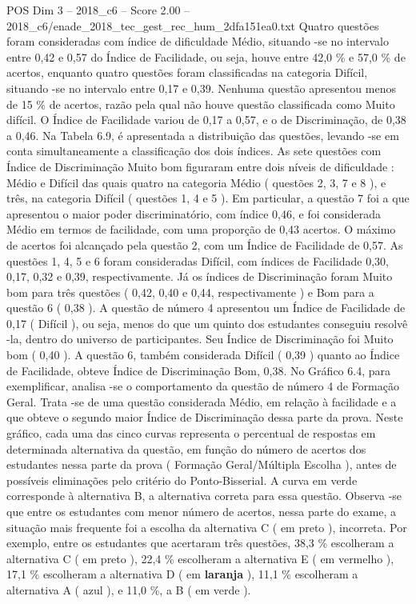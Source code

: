 \begin{textsample}{POS Dim 3 – 2018\_c6 – Score 2.00 – 2018\_c6/enade\_2018\_tec\_gest\_rec\_hum\_2dfa151ea0.txt}
Quatro questões foram consideradas com índice de dificuldade Médio, situando -se no intervalo entre 0,42 e 0,57 do Índice de Facilidade, ou seja, houve entre 42,0 \% e 57,0 \% de acertos, enquanto quatro questões foram classificadas na categoria Difícil, situando -se no intervalo entre 0,17 e 0,39.
Nenhuma questão apresentou menos de 15 \% de acertos, razão pela qual não houve questão classificada como Muito difícil.
O Índice de Facilidade variou de 0,17 a 0,57, e o de Discriminação, de 0,38 a 0,46.
Na Tabela 6.9, é apresentada a distribuição das questões, levando -se em conta simultaneamente a classificação dos dois índices.
As sete questões com Índice de Discriminação Muito bom figuraram entre dois níveis de dificuldade : Médio e Difícil das quais quatro na categoria Médio ( questões 2, 3, 7 e 8 ), e três, na categoria Difícil ( questões 1, 4 e 5 ).
Em particular, a questão 7 foi a que apresentou o maior poder discriminatório, com índice 0,46, e foi considerada Médio em termos de facilidade, com uma proporção de 0,43 acertos.
O máximo de acertos foi alcançado pela questão 2, com um Índice de Facilidade de 0,57.
As questões 1, 4, 5 e 6 foram consideradas Difícil, com índices de Facilidade 0,30, 0,17, 0,32 e 0,39, respectivamente.
Já os índices de Discriminação foram Muito bom para três questões ( 0,42, 0,40 e 0,44, respectivamente ) e Bom para a questão 6 ( 0,38 ).
A questão de número 4 apresentou um Índice de Facilidade de 0,17 ( Difícil ), ou seja, menos do que um quinto dos estudantes conseguiu resolvê -la, dentro do universo de participantes.
Seu Índice de Discriminação foi Muito bom ( 0,40 ).
A questão 6, também considerada Difícil ( 0,39 ) quanto ao Índice de Facilidade, obteve Índice de Discriminação Bom, 0,38.
No Gráfico 6.4, para exemplificar, analisa -se o comportamento da questão de número 4 de Formação Geral.
Trata -se de uma questão considerada Médio, em relação à facilidade e a que obteve o segundo maior Índice de Discriminação dessa parte da prova.
Neste gráfico, cada uma das cinco curvas representa o percentual de respostas em determinada alternativa da questão, em função do número de acertos dos estudantes nessa parte da prova ( Formação Geral/Múltipla Escolha ), antes de possíveis eliminações pelo critério do Ponto-Bisserial.
A curva em verde corresponde à alternativa B, a alternativa correta para essa questão.
Observa -se que entre os estudantes com menor número de acertos, nessa parte do exame, a situação mais frequente foi a escolha da alternativa C ( em preto ), incorreta.
Por exemplo, entre os estudantes que acertaram três questões, 38,3 \% escolheram a alternativa C ( em preto ), 22,4 \% escolheram a alternativa E ( em vermelho ), 17,1 \% escolheram a alternativa D ( em \textbf{laranja} ), 11,1 \% escolheram a alternativa A ( azul ), e 11,0 \%, a B ( em verde ).

\end{textsample}

